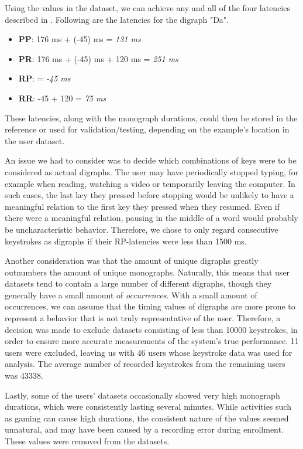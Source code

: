 Using the values in the dataset, we can achieve any and all of the four latencies described in .
Following are the latencies for the digraph "Da".
\begin{itemize}
    \item \textbf{PP}: 176 ms + (-45) ms = \textit{131 ms}
    \item \textbf{PR}: 176 ms + (-45) ms + 120 ms = \textit{251 ms}
    \item \textbf{RP}: = \textit{-45 ms}
    \item \textbf{RR}: -45 + 120 = \textit{75 ms}
\end{itemize}
These latencies, along with the monograph durations, could then be stored in the reference or used for validation/testing, depending on the example's location in the user dataset.

An issue we had to consider was to decide which combinations of keys were to be considered as actual digraphs.
The user may have periodically stopped typing, for example when reading, watching a video or temporarily leaving the computer. 
In such cases, the last key they pressed before stopping would be unlikely to have a meaningful relation to the first key they pressed when they resumed.
Even if there were a meaningful relation, pausing in the middle of a word would probably be uncharacteristic behavior.
Therefore, we chose to only regard consecutive keystrokes as digraphs if their RP-latencies were less than 1500 ms.

Another consideration was that the amount of unique digraphs greatly outnumbers the amount of unique monographs.
Naturally, this means that user datasets tend to contain a large number of different digraphs, though they generally have a small amount of \textit{occurrences}.
With a small amount of occurrences, we can assume that the timing values of digraphs are more prone to represent a behavior that is not truly representative of the user.
Therefore, a decision was made to exclude datasets consisting of less than 10000 keystrokes, in order to ensure more accurate measurements of the system's true performance.
11 users were excluded, leaving us with 46 users whose keystroke data was used for analysis.
The average number of recorded keystrokes from the remaining users was 43338.

Lastly, some of the users' datasets occasionally showed very high monograph durations, which were consistently lasting several minutes.
While activities such as gaming can cause high durations, the  consistent nature of the values seemed unnatural, and may have been caused by a recording error during enrollment.
These values were removed from the datasets.

